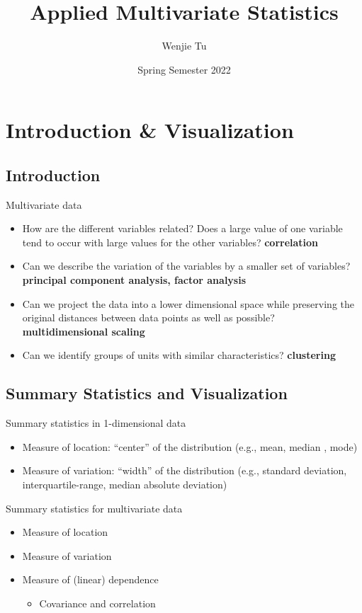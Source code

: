 \documentclass[a4paper]{article}
\title{%
    Applied Multivariate Statistics
}
\author{Wenjie Tu}
\date{Spring Semester 2022}
\begin{document}

\section{Introduction \& Visualization}

\subsection{Introduction}

Multivariate data
\begin{itemize}
    \item How are the different variables related? Does a large value of one variable tend to occur with large values for the other variables? \textbf{correlation}
    \item Can we describe the variation of the variables by a smaller set of variables? \textbf{principal component analysis, factor analysis}
    \item Can we project the data into a lower dimensional space while preserving the original distances between data points as well as possible? \textbf{multidimensional scaling}
    \item Can we identify groups of units with similar characteristics? \textbf{clustering}
\end{itemize}

\subsection{Summary Statistics and Visualization}

Summary statistics in 1-dimensional data
\begin{itemize}
    \item Measure of location: ``center'' of the distribution (e.g., mean, median , mode)
    \item Measure of variation: ``width'' of the distribution (e.g., standard deviation, interquartile-range, median absolute deviation)
\end{itemize}

Summary statistics for multivariate data
\begin{itemize}
    \item Measure of location
    \item Measure of variation
    \item Measure of (linear) dependence
    \begin{itemize}
        \item Covariance and correlation
    \end{itemize}
\end{itemize}
\end{document}
